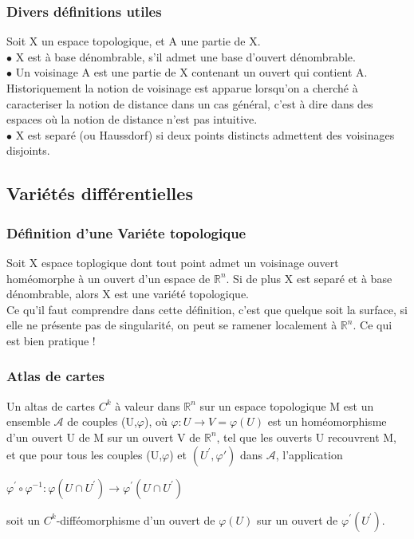 \documentclass[a4paper,11pt]{article} %
\numberwithin{equation}{section} %
\numberwithin{figure}{section} %
\theoremstyle{plain} %
\theoremstyle{definition} %
\theoremstyle{remark} %
\begin{document}
\subsubsection{Divers d\'efinitions utiles}

\noindent
Soit X un espace topologique, et A une partie de X.\\
$\bullet$ \hspace{0.17cm} X est \`a base d\'enombrable, s'il admet une base d'ouvert d\'enombrable.\\
$\bullet$ \hspace{0.17cm} Un voisinage A est une partie de X contenant un ouvert qui contient A. Historiquement la notion de voisinage est apparue lorsqu'on a cherch\'e \`a caracteriser la notion de distance dans un cas g\'en\'eral, c'est \`a dire dans des espaces o\`u la notion de distance n'est pas intuitive. \\
$\bullet$ \hspace{0.17cm} X est separ\'e (ou Haussdorf) si deux points distincts admettent des voisinages disjoints.\\

\subsection{Vari\'et\'es diff\'erentielles}

\subsubsection{D\'efinition d'une Vari\'ete topologique}

\noindent
Soit X espace toplogique dont tout point admet un voisinage ouvert hom\'eomorphe \`a un ouvert d'un espace de $\mathbb{R}^{n}$.
Si de plus X est separ\'e et \`a base d\'enombrable, alors X est une vari\'et\'e topologique.\\

\noindent
Ce qu'il faut comprendre dans cette d\'efinition, c'est que quelque soit la surface, si elle ne pr\'esente pas de singularit\'e, on peut se ramener localement \`a $\mathbb{R}^{n}$. Ce qui est bien pratique !

\subsubsection{Atlas de cartes}

\noindent
Un altas de cartes $C^{k}$ \`a valeur dans $\mathbb{R}^{n}$ sur un espace topologique M est un ensemble $\mathcal{A}$ de couples (U,$\varphi$), o\`u  $\varphi : U \rightarrow V = \varphi (U) $ est un hom\'eomorphisme d'un ouvert U de M sur un ouvert V de $\mathbb{R}^{n}$, tel que les ouverts U recouvrent M, et que pour tous les couples (U,$\varphi$) et $(U^{'},\varphi{'})$ dans $\mathcal{A}$, l'application \\
\begin{center} $ \varphi^{'} \circ \varphi^{-1} : \varphi (U \cap U^{'}) \rightarrow \varphi^{'} (U \cap U^{'}) $ \end{center}
soit un $C^{k}$-diff\'eomorphisme d'un ouvert de $\varphi (U)$ sur un ouvert de $\varphi^{'} (U^{'})$.\\
\end{document}
